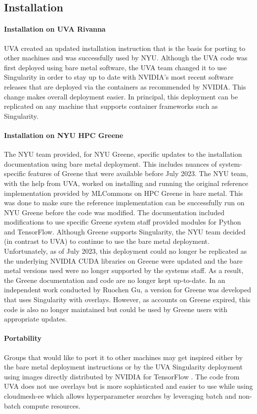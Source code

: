 \documentclass[sigplan,screen]{acmart}
\begin{document}
\subsection{Installation}
\label{sec:install}

\paragraph{Installation on UVA Rivanna} UVA created an updated installation instruction that is the basis for porting to other machines and was successfully used by NYU. Although the UVA code was first deployed using bare metal software, the UVA team changed it to use Singularity in order to stay up to date with NVIDIA's most recent software releases that are deployed via the containers as recommended by NVIDIA. This change makes overall deployment easier. In principal, this deployment can be replicated on any machine that supports container frameworks such as Singularity.

\paragraph{Installation on NYU HPC Greene} The NYU team provided, for NYU Greene, specific updates to the installation documentation using bare metal deployment. This includes nuances of system-specific features of Greene that were available before July 2023. The NYU team, with the help from UVA, worked on installing and running the original reference implementation provided by MLCommons on HPC Greene in bare metal.  This was done to make sure the reference implementation can be successfully run on NYU Greene before the code was modified. 
The documentation included modifications to use specific Greene system staff provided modules for Python and TensorFlow.  
Although Greene supports Singularity, the NYU team decided (in contrast to UVA) to continue to use the bare metal deployment. Unfortunately, as of July 2023, this deployment could no longer be replicated as the underlying NVIDIA CUDA libraries on Greene were updated and the bare metal versions used were no longer supported by the systems staff. As a result, the Greene documentation and code are no longer kept up-to-date.
In an independent work conducted by Ruochen Gu, a version for Greene was developed that uses Singularity with overlays. However, as accounts on Greene expired, this code is also no longer maintained but could be used by Greene users with appropriate updates.


\paragraph{Portability} Groups that would like to port it to other machines may get inspired either by the bare metal deployment instructions or by the UVA Singularity deployment using images directly distributed by NVIDIA for TensorFlow \cite{las-2023-escience-cloudmask}. The code from UVA does not use overlays but is more sophisticated and easier to use while using cloudmesh-ee which allows hyperparameter searches by leveraging batch and non-batch compute resources.
\end{document}
